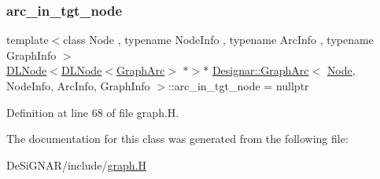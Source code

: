 \subsubsection{\texorpdfstring{arc\+\_\+in\+\_\+tgt\+\_\+node}{arc\_in\_tgt\_node}}
{\footnotesize\ttfamily template$<$class Node , typename Node\+Info , typename Arc\+Info , typename Graph\+Info $>$ \\
\hyperlink{class_designar_1_1_d_l_node}{D\+L\+Node}$<$\hyperlink{class_designar_1_1_d_l_node}{D\+L\+Node}$<$\hyperlink{class_designar_1_1_graph_arc}{Graph\+Arc}$>$ $\ast$$>$$\ast$ \hyperlink{class_designar_1_1_graph_arc}{Designar\+::\+Graph\+Arc}$<$ \hyperlink{namespace_designar_a5af326c65aa2bd26b26c410f2030d09e}{Node}, Node\+Info, Arc\+Info, Graph\+Info $>$\+::arc\+\_\+in\+\_\+tgt\+\_\+node = nullptr\hspace{0.3cm}{\ttfamily [protected]}}



Definition at line 68 of file graph.\+H.



The documentation for this class was generated from the following file\+:\begin{DoxyCompactItemize}
\item 
De\+Si\+G\+N\+A\+R/include/\hyperlink{graph_8_h}{graph.\+H}\end{DoxyCompactItemize}
